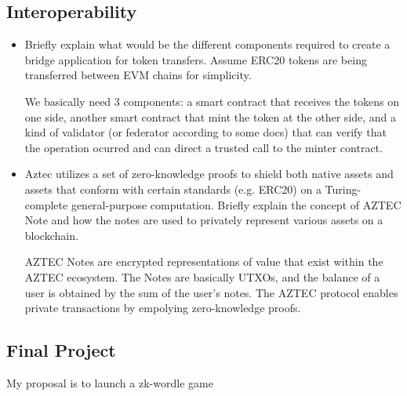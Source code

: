 \documentclass{article}
\begin{document}
\subsection*{Interoperability}
\begin{itemize}
    \item Briefly explain what would be the different components required to create a bridge application for token transfers. Assume ERC20 tokens are being transferred between EVM chains for simplicity. \par We basically need 3 components: a smart contract that receives the tokens on one side, another smart contract that mint the token at the other side, and a kind of validator (or federator according to some docs) that can verify that the operation ocurred and can direct a trusted call to the minter contract.
    \item Aztec utilizes a set of zero-knowledge proofs to shield both native assets and assets that conform with certain standards (e.g. ERC20) on a Turing-complete general-purpose computation. Briefly explain the concept of AZTEC Note and how the notes are used to privately represent various assets on a blockchain. \par AZTEC Notes are encrypted representations of value that exist within the AZTEC ecosystem. The Notes are basically UTXOs, and the balance of a user is obtained by the sum of the user's notes. The AZTEC protocol enables private transactions by empolying zero-knowledge proofs.
\end{itemize}

\subsection*{Final Project}
My proposal is to launch a zk-wordle game 
\end{document}
